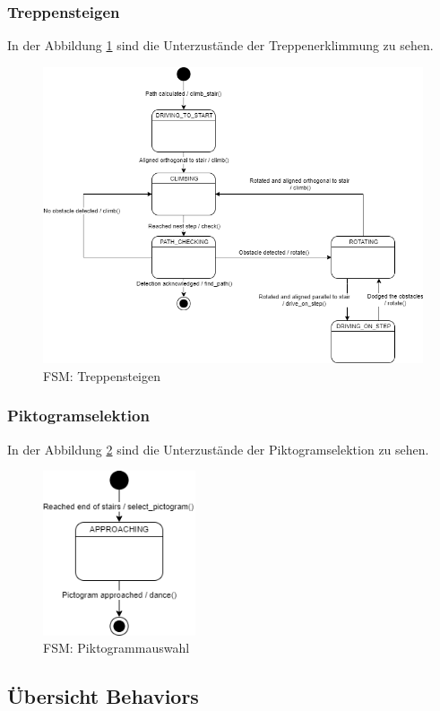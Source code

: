 \subsubsection{Treppensteigen}
In der Abbildung \ref{fig:fsm-stair-climbing} sind die Unterzustände der Treppenerklimmung zu sehen.
\begin{figure}[H]
  \includegraphics[width=1\textwidth]{img/softwarearchitektur/FSM-STAIR_CLIMBING.png}
  \centering
  \caption{FSM: Treppensteigen}
  \label{fig:fsm-stair-climbing}
\end{figure}

\subsubsection{Piktogramselektion}
In der Abbildung \ref{fig:fsm-pictogram-selection} sind die Unterzustände der Piktogramselektion zu sehen. 
\begin{figure}[H]
  \includegraphics[width=0.40\textwidth]{img/softwarearchitektur/FSM-PICTOGRAM_SELECTION.png}
  \centering
  \caption{FSM: Piktogrammauswahl}
  \label{fig:fsm-pictogram-selection}
\end{figure}

\subsection{Übersicht Behaviors}

